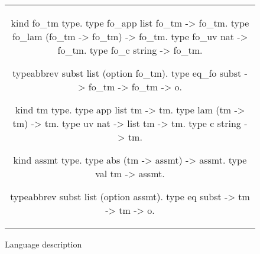 \begin{figure*}
  \begin{tabular}{c}
    \begin{minipage}{.35\textwidth}

      \begin{elpicode}
        kind fo_tm type.
        type fo_app list fo_tm -> fo_tm.
        type fo_lam (fo_tm -> fo_tm) -> fo_tm.
        type fo_uv  nat -> fo_tm.
        type fo_c string -> fo_tm.



        
        
        typeabbrev subst list (option fo_tm).
        type eq_fo subst -> fo_tm -> fo_tm -> o.
      \end{elpicode}
    \end{minipage}
    \begin{minipage}{.35\textwidth}
      
      \begin{elpicode}
        kind tm type.
        type app list tm -> tm.
        type lam (tm -> tm) -> tm.
        type uv  nat -> list tm -> tm.
        type c string -> tm.
        
        kind assmt type.
        type abs (tm -> assmt) -> assmt.
        type val tm -> assmt.
        
        typeabbrev subst list (option assmt).
        type eq subst -> tm -> tm -> o.
      \end{elpicode}
    \end{minipage}
  \end{tabular}
  
  \caption{Language description}
  \label{code:lang-descr}
\end{figure*}



